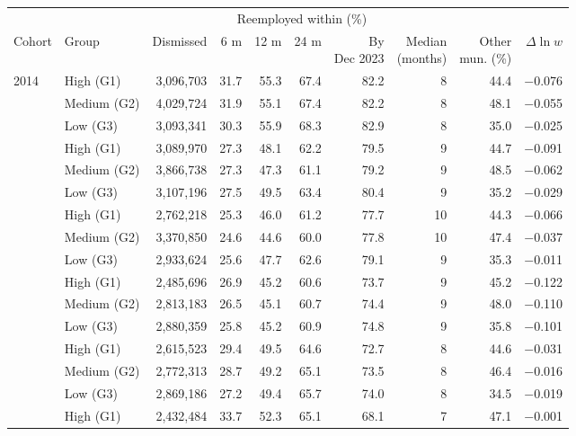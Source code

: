 {\footnotesize
\setlength{\tabcolsep}{5.2pt}
\begin{threeparttable}
\begin{tabular}{llrrrrrrrr}
\toprule
 & & & \multicolumn{4}{c}{Reemployed within (\%)} & & & \\
\cmidrule(lr){4-7}
Cohort & Group & Dismissed & 6 m & 12 m & 24 m & \shortstack{By\\Dec 2023} & \shortstack{Median\\(months)} & \shortstack{Other\\mun. (\%)} & $\Delta \ln w$ \\
\midrule
2014 & High (G1) & 3,096,703 & 31.7 & 55.3 & 67.4 & 82.2 & 8 & 44.4 & $-$0.076 \\
 & Medium (G2) & 4,029,724 & 31.9 & 55.1 & 67.4 & 82.2 & 8 & 48.1 & $-$0.055 \\
 & Low (G3) & 3,093,341 & 30.3 & 55.9 & 68.3 & 82.9 & 8 & 35.0 & $-$0.025 \\
\addlinespace[3pt]
2015 & High (G1) & 3,089,970 & 27.3 & 48.1 & 62.2 & 79.5 & 9 & 44.7 & $-$0.091 \\
 & Medium (G2) & 3,866,738 & 27.3 & 47.3 & 61.1 & 79.2 & 9 & 48.5 & $-$0.062 \\
 & Low (G3) & 3,107,196 & 27.5 & 49.5 & 63.4 & 80.4 & 9 & 35.2 & $-$0.029 \\
\addlinespace[3pt]
2016 & High (G1) & 2,762,218 & 25.3 & 46.0 & 61.2 & 77.7 & 10 & 44.3 & $-$0.066 \\
 & Medium (G2) & 3,370,850 & 24.6 & 44.6 & 60.0 & 77.8 & 10 & 47.4 & $-$0.037 \\
 & Low (G3) & 2,933,624 & 25.6 & 47.7 & 62.6 & 79.1 & 9 & 35.3 & $-$0.011 \\
\addlinespace[3pt]
2019 & High (G1) & 2,485,696 & 26.9 & 45.2 & 60.6 & 73.7 & 9 & 45.2 & $-$0.122 \\
 & Medium (G2) & 2,813,183 & 26.5 & 45.1 & 60.7 & 74.4 & 9 & 48.0 & $-$0.110 \\
 & Low (G3) & 2,880,359 & 25.8 & 45.2 & 60.9 & 74.8 & 9 & 35.8 & $-$0.101 \\
\addlinespace[3pt]
2020 & High (G1) & 2,615,523 & 29.4 & 49.5 & 64.6 & 72.7 & 8 & 44.6 & $-$0.031 \\
 & Medium (G2) & 2,772,313 & 28.7 & 49.2 & 65.1 & 73.5 & 8 & 46.4 & $-$0.016 \\
 & Low (G3) & 2,869,186 & 27.2 & 49.4 & 65.7 & 74.0 & 8 & 34.5 & $-$0.019 \\
\addlinespace[3pt]
2021 & High (G1) & 2,432,484 & 33.7 & 52.3 & 65.1 & 68.1 & 7 & 47.1 & $-$0.001 \\

\end{tabular}
\end{threeparttable}}
